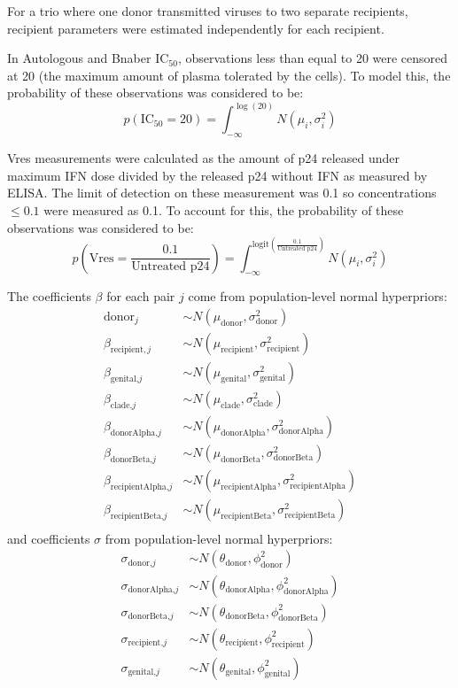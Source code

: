 \documentclass[12pt]{article}
\newcommand{\icFifty}{IC$_{50}$}
\begin{document}
For a trio where one donor transmitted viruses to two separate recipients, recipient parameters were estimated independently for each recipient.

In Autologous and Bnaber \icFifty{}, observations less than equal to 20 were censored at 20 (the maximum amount of plasma tolerated by the cells).
  To model this, the probability of these observations was considered to be:
\[p(\text{\icFifty}=20)=\int_{-\infty}^{\log(20)}N(\mu_i,\sigma^2_i)\]

Vres measurements were calculated as the amount of p24 released under maximum IFN dose divided by the released p24 without IFN as measured by ELISA. The limit of detection on these measurement was 0.1 so concentrations $\leq 0.1$ were measured as 0.1.
  To account for this, the probability of these observations was considered to be:
\[p\left(\text{Vres}=\frac{0.1}{\text{Untreated p24}}\right)=\int_{-\infty}^{\text{logit}\left(\frac{0.1}{\text{Untreated p24}}\right)}N(\mu_i,\sigma^2_i)\]

The coefficients $\beta$ for each pair $j$ come from population-level normal hyperpriors:
\begin{align*}
\text{donor}_{j} & \sim  N(\mu_{\text{donor}},\sigma^2_{\text{donor}})\\
\beta_{\text{recipient},j} & \sim  N(\mu_{\text{recipient}},\sigma^2_{\text{recipient}})\\
\beta_{\text{genital,}j} & \sim  N(\mu_{\text{genital}},\sigma^2_{\text{genital}})\\
\beta_{\text{clade,}j} & \sim  N(\mu_{\text{clade}},\sigma^2_{\text{clade}}) \\
\beta_{\text{donorAlpha,}j} & \sim  N(\mu_{\text{donorAlpha}},\sigma^2_{\text{donorAlpha}}) \\
\beta_{\text{donorBeta,}j} & \sim  N(\mu_{\text{donorBeta}},\sigma^2_{\text{donorBeta}}) \\
\beta_{\text{recipientAlpha,}j} & \sim  N(\mu_{\text{recipientAlpha}},\sigma^2_{\text{recipientAlpha}}) \\
\beta_{\text{recipientBeta,}j} & \sim  N(\mu_{\text{recipientBeta}},\sigma^2_{\text{recipientBeta}}) \\
\end{align*}
and coefficients $\sigma$ from population-level normal hyperpriors:
\begin{align*}
\sigma_{\text{donor,}j} & \sim  N(\theta_\text{donor},\phi^2_\text{donor})\\
\sigma_{\text{donorAlpha,}j} & \sim  N(\theta_\text{donorAlpha},\phi^2_\text{donorAlpha})\\
\sigma_{\text{donorBeta,}j} & \sim  N(\theta_\text{donorBeta},\phi^2_\text{donorBeta})\\
\sigma_{\text{recipient,}j} & \sim  N(\theta_\text{recipient},\phi^2_\text{recipient})\\
\sigma_{\text{genital,}j} & \sim  N(\theta_\text{genital},\phi^2_\text{genital})\\
\end{align*}
\end{document}
